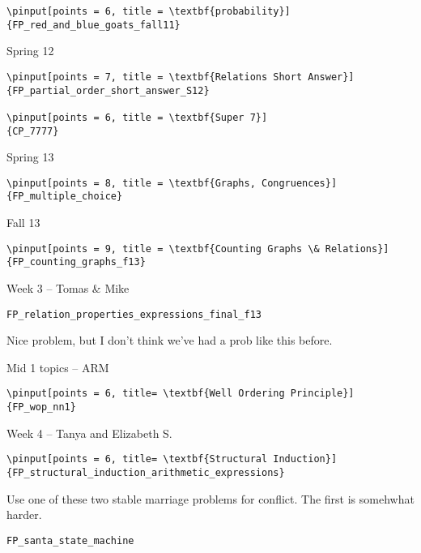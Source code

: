 \documentclass[quiz]{mcs}
\begin{document}
\begin{staffnotes}
\begin{verbatim}
\pinput[points = 6, title = \textbf{probability}]
{FP_red_and_blue_goats_fall11}
\end{verbatim}

Spring 12

\begin{verbatim}
\pinput[points = 7, title = \textbf{Relations Short Answer}]
{FP_partial_order_short_answer_S12}

\pinput[points = 6, title = \textbf{Super 7}]
{CP_7777}
\end{verbatim}

Spring 13

\begin{verbatim}
\pinput[points = 8, title = \textbf{Graphs, Congruences}]
{FP_multiple_choice}
\end{verbatim}

Fall 13

\begin{verbatim}
\pinput[points = 9, title = \textbf{Counting Graphs \& Relations}]
{FP_counting_graphs_f13}
\end{verbatim}

\begin{center}
{\large Week 3 -- Tomas \& Mike}
\end{center}
\begin{verbatim}
FP_relation_properties_expressions_final_f13
\end{verbatim}
Nice problem, but I don't think we've had a prob like this before.

\begin{center}
{\large Mid 1 topics -- ARM }
\end{center}

\begin{verbatim}
\pinput[points = 6, title= \textbf{Well Ordering Principle}]
{FP_wop_nn1}
\end{verbatim}

\begin{center}
{\large Week 4 -- Tanya and Elizabeth S.}
\end{center}

\begin{verbatim}
\pinput[points = 6, title= \textbf{Structural Induction}]
{FP_structural_induction_arithmetic_expressions}
\end{verbatim}

Use one of these two stable marriage problems for conflict.  The first
is somehwhat harder.

\begin{verbatim}
FP_santa_state_machine
\end{verbatim}


\end{staffnotes}
\end{document}
